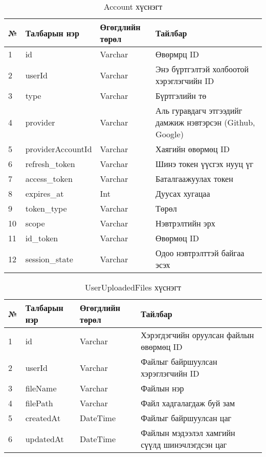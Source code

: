 \begin{table}[h]
	\caption{Account хүснэгт}
	\begin{tabular}{|l|l|l|p{8cm}|}
	\hline
	№ &  Талбарын нэр & Өгөгдлийн төрөл & Тайлбар \\ \hline
	1 &  id & Varchar & Өвөрмрц ID \\ \hline
	2 &  userId & Varchar & Энэ бүртгэлтэй холбоотой хэрэглэгчийн ID \\ \hline
	3 &  type & Varchar & Бүртгэлийн тө \\ \hline
	4 &  provider & Varchar & Аль гуравдагч этгээдийг дамжиж нэвтэрсэн (Github, Google) \\ \hline
	5 &  providerAccountId & Varchar & Хаягийн өвөрмөц ID \\ \hline
    6 &  refresh\_token & Varchar & Шинэ токен үүсгэх нууц үг\\ \hline
    7 &  access\_token & Varchar & Баталгаажуулах токен \\ \hline
    8 &  expires\_at & Int & Дуусах хугацаа\\ \hline
    9 &  token\_type & Varchar & Төрөл \\ \hline
    10 &  scope & Varchar & Нэвтрэлтийн эрх \\ \hline
    11 &  id\_token & Varchar & Өвөрмөц ID \\ \hline
    12 &  session\_state & Varchar & Одоо нэвтрэлттэй байгаа эсэх\\ \hline
\end{tabular}
\end{table}

\begin{table}[h]
	\caption{UserUploadedFiles хүснэгт}
	\begin{tabular}{|l|l|l|p{8cm}|}
	\hline
	№ &  Талбарын нэр & Өгөгдлийн төрөл & Тайлбар \\ \hline
	1 &  id & Varchar & Хэрэгдэгчийн оруулсан файлын өвөрмөц ID\\ \hline
	2 &  userId & Varchar & Файлыг байршуулсан хэрэглэгчийн ID \\ \hline
	3 &  fileName & Varchar & Файлын нэр\\ \hline
	4 &  filePath & Varchar & Файл хадгалагдаж буй зам \\ \hline
	5 &  createdAt & DateTime & Файлыг байршуулсан цаг \\ \hline
	6 &  updatedAt & DateTime & Файлын мэдээлэл хамгийн сүүлд шинэчлэгдсэн цаг \\ \hline
\end{tabular}
\end{table}

